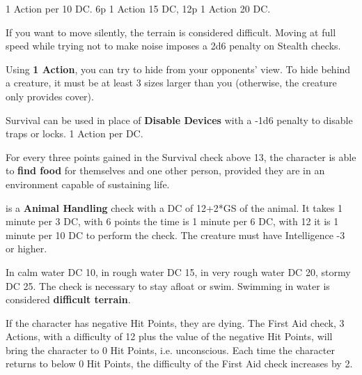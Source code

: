 \documentclass[landscape,10pt,a4paper]{article}
\begin{document}
\begin{multicols}{3}
\begin{dmbox}[title=Artist of Escape - page \pageref{escapeartist}]
1 Action per 10 DC. 6p 1 Action 15 DC, 12p 1 Action 20 DC.
\end{dmbox}

\begin{dmbox}[title=Stealth - page \pageref{stealth}]
If you want to move silently, the terrain is considered difficult. Moving at full speed while trying not to make noise imposes a 2d6 penalty on Stealth checks.

Using \textbf{1 Action}, you can try to hide from your opponents' view. To hide behind a creature, it must be at least 3 sizes larger than you (otherwise, the creature only provides cover).
\end{dmbox}


\begin{dmbox}[title=Survival - page \pageref{survival}]
Survival can be used in place of \textbf{Disable Devices} with a -1d6 penalty to disable traps or locks. 1 Action per DC.

For every three points gained in the Survival check above 13, the character is able to \textbf{find food} for themselves and one other person, provided they are in an environment capable of sustaining life.
\end{dmbox}

\begin{dmbox}[title=Handle Animals - Tame an animal - page \pageref{handlinganimals}]
is a \textbf{Animal Handling} check with a DC of 12+2*GS of the animal. It takes 1 minute per 3 DC, with 6 points the time is 1 minute per 6 DC, with 12 it is 1 minute per 10 DC to perform the check. The creature must have Intelligence -3 or higher.
\end{dmbox}

\begin{dmbox}[title=Swimming - page \pageref{compnuotare} - \pageref{combatteresottacqua}]
In calm water DC 10, in rough water DC 15, in very rough water DC 20, stormy DC 25. The check is necessary to stay afloat or swim. Swimming in water is considered \textbf{difficult terrain}.
\end{dmbox}

\begin{dmbox}[title=First Aid - page \pageref{firstaid}]
If the character has negative Hit Points, they are dying. The First Aid check, 3 Actions, with a difficulty of 12 plus the value of the negative Hit Points, will bring the character to 0 Hit Points, i.e. unconscious. Each time the character returns to below 0 Hit Points, the difficulty of the First Aid check increases by 2.


\end{dmbox}
\end{multicols}
\end{document}

